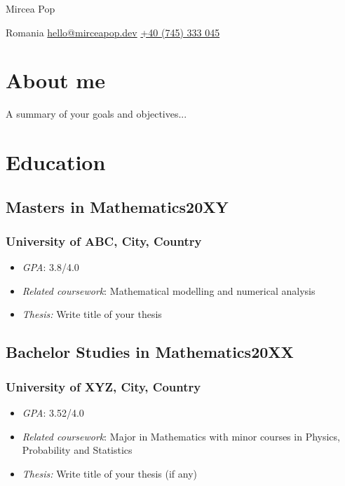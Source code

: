 \documentclass[11pt]{article}
\begin{document}
    
    \begin{center}      
        {\fontsize{28}{28}\selectfont Mircea Pop} \\ \bigskip
    
        {\color{icnclr}\faMapMarker} Romania \quad 
        {\color{icnclr}\faEnvelope[regular]} \href{mailto:hello@mirceapop.dev}{hello@mirceapop.dev} \quad
        {\color{icnclr}} \href{tel:+40745333045}{+40 (745) 333 045} 
    \end{center}
    \section{About me}
    A summary of your goals and objectives...
    \section{Education}
    \subsection{Masters in Mathematics\hfill \normalfont 20XY}  
    
    \subsubsection{University of ABC,  City, Country}
    \begin{itemize}
        \item[\checkmark] \textit{GPA}: 3.8/4.0
        \item[\checkmark] \textit{Related coursework}: Mathematical modelling and numerical analysis
        \item[\checkmark] \textit{Thesis:} Write title of your thesis
        \end{itemize}
    \subsection{Bachelor Studies in Mathematics\hfill \normalfont 20XX}  
    
    \subsubsection{University of XYZ,  City, Country}
    \begin{itemize}
        \item[\checkmark] \textit{GPA}: 3.52/4.0
        \item[\checkmark] \textit{Related coursework}: Major in Mathematics with minor courses in Physics, Probability and Statistics
        \item[\checkmark] \textit{Thesis:} Write title of your thesis (if any)
        \end{itemize}
        
\end{document}
